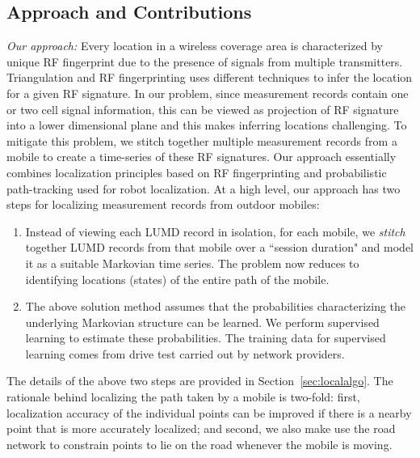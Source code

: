 \documentclass[conference, 10pt]{IEEEtran}
\begin{document}
\subsection{Approach and Contributions}

{\em Our approach:} Every location in a wireless coverage area is characterized by
unique RF fingerprint due to the presence of signals from
multiple transmitters.  Triangulation and RF fingerprinting uses different techniques
to infer the location for a given RF signature. In our problem, since measurement
records contain one or two cell signal information, this can be viewed as projection
of RF signature into a lower dimensional plane and this makes inferring locations
challenging. To mitigate this problem, we stitch together multiple measurement
records from a mobile to create a time-series of these RF signatures. Our approach essentially combines
localization principles based on RF fingerprinting and probabilistic path-tracking
used for robot localization. At a high level, our approach has two steps for
localizing measurement records from outdoor mobiles:

\begin{enumerate}
\item Instead of viewing each LUMD record in isolation, for each mobile, we {\em stitch}
together LUMD records from that mobile over a ``session
duration"  and model it as a suitable Markovian time series. The problem now
reduces to identifying locations (states) of the entire path of
the mobile.

\item The above solution method assumes that the probabilities characterizing the
underlying Markovian structure can be learned. We perform supervised learning to
estimate these probabilities. The training data for supervised learning comes from
drive test carried out by network providers.
	
\end{enumerate}

The details of the above two steps are provided in Section~\ref{sec:localalgo}.
The rationale behind localizing the path taken by a mobile is two-fold: first,
localization accuracy of the individual points can be improved if there is a
nearby point that is more accurately localized; and second, we also make use the
road network to constrain points to lie on the road whenever the mobile is
moving.
\end{document}
